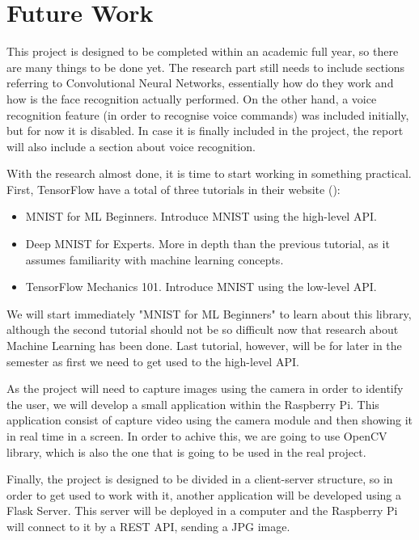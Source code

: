 \chapter{Future Work}
\label{future-work}

This project is designed to be completed within an academic full year, so there are many things to be done yet. The research part still needs to include sections referring to Convolutional Neural Networks, essentially how do they work and how is the face recognition actually performed. On the other hand, a voice recognition feature (in order to recognise voice commands) was included initially, but for now it is disabled. In case it is finally included in the project, the report will also include a section about voice recognition. 

With the research almost done, it is time to start working in something practical. First, TensorFlow have a total of three tutorials in their website (\cite{tensorflow_main_website}):

\begin{itemize}
	\item MNIST for ML Beginners. Introduce MNIST using the high-level API.
	\item Deep MNIST for Experts. More in depth than the previous tutorial, as it assumes familiarity with machine learning concepts.
	\item TensorFlow Mechanics 101. Introduce MNIST using the low-level API.
\end{itemize}  

We will start immediately "MNIST for ML Beginners" to learn about this library, although the second tutorial should not be so difficult now that research about Machine Learning has been done. Last tutorial, however, will be for later in the semester as first we need to get used to the high-level API.

As the project will need to capture images using the camera in order to identify the user, we will develop a small application within the Raspberry Pi. This application consist of capture video using the camera module and then showing it in real time in a screen. In order to achive this, we are going to use OpenCV library, which is also the one that is going to be used in the real project.

Finally, the project is designed to be divided in a client-server structure, so in order to get used to work with it, another application will be developed using a Flask Server. This server will be deployed in a computer and the Raspberry Pi will connect to it by a REST API, sending a JPG image.

